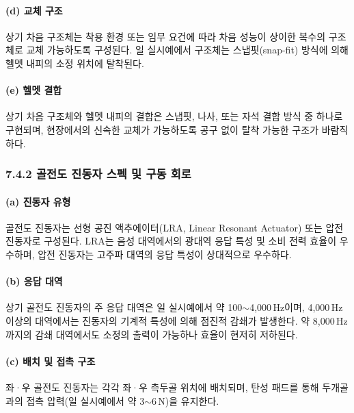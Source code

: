 \documentclass{article}
\begin{document}
\paragraph{(d) 교체 구조}

상기 차음 구조체는 착용 환경 또는 임무 요건에 따라 차음 성능이 상이한 복수의 구조체로 교체 가능하도록 구성된다. 일 실시예에서 구조체는 스냅핏(snap-fit) 방식에 의해 헬멧 내피의 소정 위치에 탈착된다.

\paragraph{(e) 헬멧 결합}

상기 차음 구조체와 헬멧 내피의 결합은 스냅핏, 나사, 또는 자석 결합 방식 중 하나로 구현되며, 현장에서의 신속한 교체가 가능하도록 공구 없이 탈착 가능한 구조가 바람직하다.

\subsubsection{7.4.2 골전도 진동자 스펙 및 구동 회로}

\paragraph{(a) 진동자 유형}

골전도 진동자는 선형 공진 액추에이터(LRA, Linear Resonant Actuator) 또는 압전 진동자로 구성된다. LRA는 음성 대역에서의 광대역 응답 특성 및 소비 전력 효율이 우수하며, 압전 진동자는 고주파 대역의 응답 특성이 상대적으로 우수하다.

\paragraph{(b) 응답 대역}

상기 골전도 진동자의 주 응답 대역은 일 실시예에서 약 100$\sim$4{,}000\,Hz이며, 4{,}000\,Hz 이상의 대역에서는 진동자의 기계적 특성에 의해 점진적 감쇄가 발생한다. 약 8{,}000\,Hz까지의 감쇄 대역에서도 소정의 출력이 가능하나 효율이 현저히 저하된다.

\paragraph{(c) 배치 및 접촉 구조}

좌·우 골전도 진동자는 각각 좌·우 측두골 위치에 배치되며, 탄성 패드를 통해 두개골과의 접촉 압력(일 실시예에서 약 3$\sim$6\,N)을 유지한다.
\end{document}
